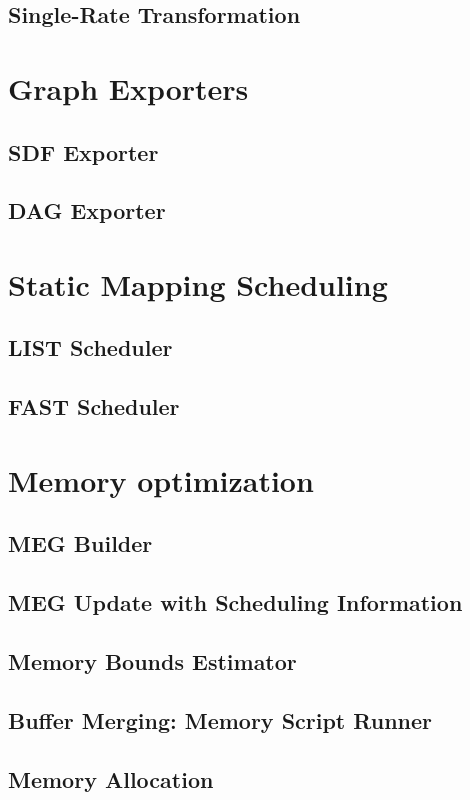 \documentclass[10pt,letterpaper]{report}
\begin{document}
	\subsection{Single-Rate Transformation}
	
	\section{Graph Exporters}
	\subsection{SDF Exporter}
	\subsection{DAG Exporter}
	
	\section{Static Mapping Scheduling}
	\subsection{LIST Scheduler}
	\subsection{FAST Scheduler}
	
	\section{Memory optimization}
	\subsection{MEG Builder}
	\subsection{MEG Update with Scheduling Information}
	\subsection{Memory Bounds Estimator}
	\label{sec:memory_bounds_estimator}
	\subsection{Buffer Merging: Memory Script Runner}
	\subsection{Memory Allocation}
	
\end{document}
